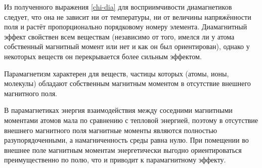 %
%
%


Из полученного выражения \eqref{chi-dia} для восприимчивости диамагнетиков
следует, что она не зависит ни от температуры, ни от величины напряжённости поля
и растёт пропорционально порядковому номеру элемента.
Диамагнитный эффект свойствен всем веществам (независимо от того, имелся ли у
атома собственный магнитный момент или нет и как он был ориентирован), однако у
некоторых веществ он перекрывается более сильным 
эффектом.


\label{sec:paramagnetism}

Парамагнетизм характерен для веществ, частицы которых (атомы, ионы, молекулы)
обладают собственным магнитным моментом в отсутствие внешнего магнитного поля.

В парамагнетиках энергия взаимодействия между соседними магнитными моментами
атомов мала по сравнению с тепловой энергией,
поэтому в отсутствие внешнего магнитного поля магнитные моменты
являются полностью разупорядоченными, а намагниченность среды равна нулю.
При помещении во внешнее поле магнитным моментам энергетически выгодно
ориентироваться преимущественно по полю, что и приводит к парамагнитному эффекту.

